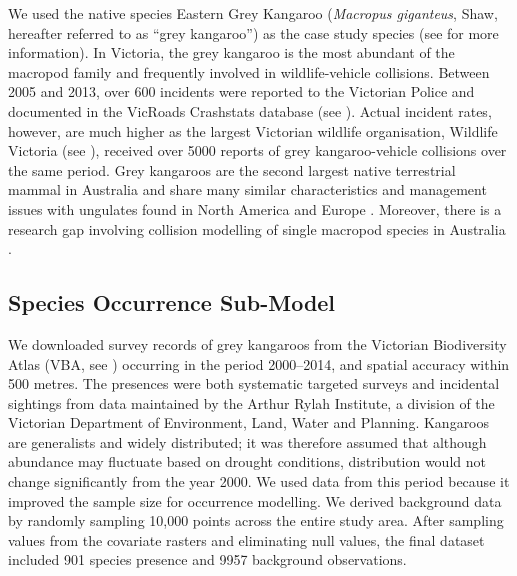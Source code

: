 We used the native species Eastern Grey Kangaroo (\textit{Macropus giganteus}, Shaw, hereafter referred to as ``grey kangaroo'') as the case study species (see  for more information). In Victoria, the grey kangaroo is the most abundant of the macropod family and frequently involved in wildlife-vehicle collisions. Between 2005 and 2013, over 600 incidents were reported to the Victorian Police and documented in the VicRoads Crashstats database (see ). Actual incident rates, however, are much higher as the largest Victorian wildlife organisation, Wildlife Victoria (see ), received over 5000 reports of grey kangaroo-vehicle collisions over the same period. Grey kangaroos are the second largest native terrestrial mammal in Australia and share many similar characteristics and management issues with ungulates found in North America and Europe \citep{crof04,coul10}. Moreover, there is a research gap involving collision modelling of single macropod species in Australia \citep{bond14}.

\subsection{Species Occurrence Sub-Model}

We downloaded survey records of grey kangaroos from the Victorian Biodiversity Atlas (VBA, see ) occurring in the period 2000--2014, and spatial accuracy within 500 metres. The presences were both systematic targeted surveys and incidental sightings from data maintained by the Arthur Rylah Institute, a division of the Victorian Department of Environment, Land, Water and Planning.  Kangaroos are generalists and widely distributed; it was therefore assumed that although abundance may fluctuate based on drought conditions, distribution would not change significantly from the year 2000.  We used data from this period because it improved the sample size for occurrence modelling.  We derived background data by randomly sampling 10,000 points across the entire study area.  After sampling values from the covariate rasters and eliminating null values, the final dataset included 901 species presence and 9957 background observations.

